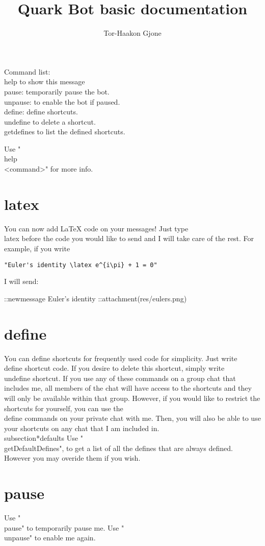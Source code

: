 
\usepackage{listings}

\title{Quark Bot basic documentation}
\author{Tor-Haakon Gjone}


\maketitle


Command list:
\\help to show this message
\\pause: temporarily pause the bot.
\\unpause: to enable the bot if paused.
\\define: define shortcuts.
\\undefine to delete a shortcut.
\\getdefines to list the defined shortcuts.

Use "\\help \\<command>" for more info.


\section{latex}
You can now add LaTeX code on your messages!
Just type \\latex before the code you would like to send and I will take care of the rest.
For example, if you write 
\begin{lstlisting}
"Euler's identity \latex e^{i\pi} + 1 = 0"
\end{lstlisting}
I will send:

::newmessage Euler's identity
::attachment(res/eulers.png)


\section{define}
You can define shortcuts for frequently used code for simplicity. Just write \\define shortcut code. If you desire to delete this shortcut, simply write \\undefine shortcut.
If you use any of these commands on a group chat that includes me, all members of the chat will have access to the shortcuts and they will only be available within that group.
However, if you would like to restrict the shortcuts for yourself, you can use the \\define commands on your private chat with me.
Then, you will also be able to use your shortcuts on any chat that I am included in.
\\subsection*{defaults}
Use "\\getDefaultDefines", to get a list of all the defines that are always defined. However you may overide them if you wish.


\section*{pause}
Use "\\pause" to temporarily pause me. Use "\\unpause" to enable me again.



